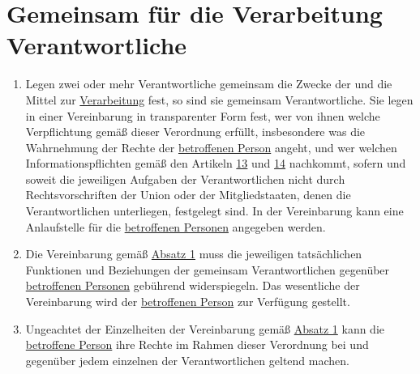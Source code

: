 \chapter{Gemeinsam für die Verarbeitung Verantwortliche}
\label{ch:26}


\begin{enumerate}

  \item Legen zwei oder mehr Verantwortliche gemeinsam die Zwecke der und die Mittel zur \hyperref[itm:04-2]{Verarbeitung} fest, so sind sie
   gemeinsam Verantwortliche. Sie legen in einer Vereinbarung in transparenter Form fest, wer von ihnen welche
   Verpflichtung gemäß dieser Verordnung erfüllt, insbesondere was die Wahrnehmung der Rechte der \hyperref[itm:04-1]{betroffenen Person}
   angeht, und wer welchen Informationspflichten gemäß den Artikeln \hyperref[ch:13]{13} und \hyperref[ch:14]
   {14} nachkommt, sofern und soweit die jeweiligen Aufgaben der Verantwortlichen nicht durch Rechtsvorschriften der
   Union oder der Mitgliedstaaten, denen die Verantwortlichen unterliegen, festgelegt sind. In der Vereinbarung kann
   eine Anlaufstelle für die \hyperref[itm:04-1]{betroffenen Personen} angegeben werden.
  \label{itm:26-1}

  \item Die Vereinbarung gemäß \hyperref[itm:26-1]{Absatz 1} muss die jeweiligen tatsächlichen Funktionen und
   Beziehungen der gemeinsam Verantwortlichen gegenüber \hyperref[itm:04-1]{betroffenen Personen} gebührend widerspiegeln. Das wesentliche
   der Vereinbarung wird der \hyperref[itm:04-1]{betroffenen Person} zur Verfügung gestellt.
  \label{itm:26-2}

  \item Ungeachtet der Einzelheiten der Vereinbarung gemäß \hyperref[itm:26-1]{Absatz 1} kann die \hyperref[itm:04-1]{betroffene Person} ihre
   Rechte im Rahmen dieser Verordnung bei und gegenüber jedem einzelnen der Verantwortlichen geltend machen.
  \label{itm:26-3}

\end{enumerate}


